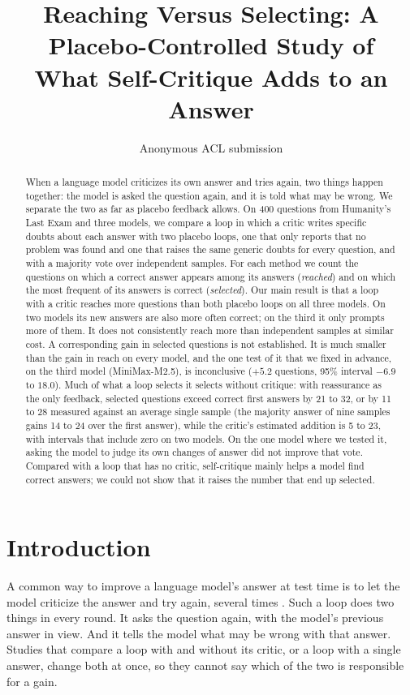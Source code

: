 \documentclass[11pt]{article}
\title{Reaching Versus Selecting: A Placebo-Controlled Study of\\What Self-Critique Adds to an Answer}
\author{Anonymous ACL submission}
\begin{document}
\maketitle

\begin{abstract}
When a language model criticizes its own answer and tries again, two things happen together: the model is asked the question again, and it is told what may be wrong.
We separate the two as far as placebo feedback allows.
On 400 questions from Humanity's Last Exam and three models, we compare a loop in which a critic writes specific doubts about each answer with two placebo loops, one that only reports that no problem was found and one that raises the same generic doubts for every question, and with a majority vote over independent samples.
For each method we count the questions on which a correct answer appears among its answers (\emph{reached}) and on which the most frequent of its answers is correct (\emph{selected}).
Our main result is that a loop with a critic reaches more questions than both placebo loops on all three models.
On two models its new answers are also more often correct; on the third it only prompts more of them.
It does not consistently reach more than independent samples at similar cost.
A corresponding gain in selected questions is not established.
It is much smaller than the gain in reach on every model, and the one test of it that we fixed in advance, on the third model (MiniMax-M2.5), is inconclusive ($+5.2$ questions, 95\% interval $-6.9$ to $18.0$).
Much of what a loop selects it selects without critique: with reassurance as the only feedback, selected questions exceed correct first answers by 21 to 32, or by 11 to 28 measured against an average single sample (the majority answer of nine samples gains 14 to 24 over the first answer), while the critic's estimated addition is 5 to 23, with intervals that include zero on two models.
On the one model where we tested it, asking the model to judge its own changes of answer did not improve that vote.
Compared with a loop that has no critic, self-critique mainly helps a model find correct answers; we could not show that it raises the number that end up selected.
\end{abstract}

\section{Introduction}

A common way to improve a language model's answer at test time is to let the model criticize the answer and try again, several times \citep{madaan2023selfrefine,shinn2023reflexion}.
Such a loop does two things in every round.
It asks the question again, with the model's previous answer in view.
And it tells the model what may be wrong with that answer.
Studies that compare a loop with and without its critic, or a loop with a single answer, change both at once, so they cannot say which of the two is responsible for a gain.
\end{document}
